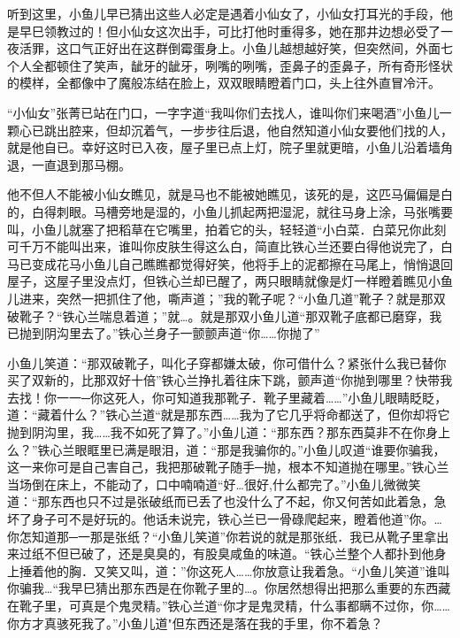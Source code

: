 \documentclass[12pt,oneside]{book}
\begin{document}
听到这里，小鱼儿早已猜出这些人必定是遇着小仙女了，小仙女打耳光的手段，他是早巳领教过的！但小仙女这次出手，可比打他时重得多，她在那井边想必受了一夜活罪，这口气正好出在这群倒霉蛋身上。小鱼儿越想越好笑，但突然间，外面七个人全都顿住了笑声，龇牙的龇牙，咧嘴的咧嘴，歪鼻子的歪鼻子，所有奇形怪状的模样，全都像中了魔般冻结在脸上，双双眼睛瞪着门口，头上往外直冒冷汗。

``小仙女''张菁已站在门口，一字字道``我叫你们去找人，谁叫你们来喝酒''小鱼儿一颗心已跳出腔来，但却沉着气，一步步往后退，他自然知道小仙女要他们找的人，就是他自已。幸好这时已入夜，屋子里已点上灯，院子里就更暗，小鱼儿沿着墙角退，一直退到那马棚。

他不但人不能被小仙女瞧见，就是马也不能被她瞧见，该死的是，这匹马偏偏是白的，白得刺眼。马槽旁地是湿的，小鱼儿抓起两把湿泥，就往马身上涂，马张嘴要叫，小鱼儿就塞了把稻草在它嘴里，拍着它的头，轻轻道``小白菜．白菜兄你此刻可千万不能叫出来，谁叫你皮肤生得这么白，简直比铁心兰还要白得他说完了，白马已变成花马小鱼儿自己瞧瞧都觉得好笑，他将手上的泥都擦在马尾上，悄悄退回屋子，这屋子里没点灯，但铁心兰却已醒了，两只眼睛就像是灯一样瞪着瞧见小鱼儿进来，突然一把抓住了他，嘶声道；''我的靴子呢？``小鱼几道''靴子？就是那双破靴子？``铁心兰喘息着道；''就\ldots。就是那双小鱼儿道``那双靴子底都已磨穿，我已抛到阴沟里去了。''铁心兰身子一颤颤声道``你\ldots\ldots 你抛了''

小鱼儿笑道：``那双破靴子，叫化子穿都嫌太破，你可借什么？紧张什么我已替你买了双新的，比那双好十倍''铁心兰挣扎着往床下跳，颤声道``你抛到哪里？快带我去找！你一一─你这死人，你可知道我那靴子．靴子里藏着\ldots\ldots{}''小鱼儿眼睛眨眨，道：``藏着什么？''铁心兰道``就是那东西\ldots\ldots 我为了它几乎将命都送了，但你却将它抛到阴沟里，我\ldots\ldots 我不如死了算了。''小鱼儿道：``那东西？那东西莫非不在你身上么？''铁心兰眼眶里已满是眼泪，道：``那是我骗你的。''小鱼儿叹道``谁要你骗我，这一来你可是自己害自己，我把那破靴子随手─抛，根本不知道抛在哪里。''铁心兰当场倒在床上，不能动了，口中喃喃道``好\ldots 很好,什么都完了。''小鱼儿微微笑道：``那东西也只不过是张破纸而已丢了也没什么了不起，你又何苦如此着急，急坏了身子可不是好玩的。他话未说完，铁心兰已一骨碌爬起来，瞪着他道''你。\ldots 你怎知道那─一那是张纸？``小鱼儿笑道''你若说的就是那张纸．我已从靴子里拿出来过纸不但已破了，还是臭臭的，有股臭咸鱼的味道。``铁心兰整个人都扑到他身上捶着他的胸．又笑又叫，道：''你这死人\ldots\ldots 你放意让我着急。``小鱼儿笑道''谁叫你骗我\ldots{}``我早巳猜出那东西是在你靴子里的\ldots。你居然想得出把那么重要的东西藏在靴子里，可真是个鬼灵精。''铁心兰道``你才是鬼灵精，什么事都瞒不过你，你\ldots\ldots 你方才真骇死我了。''小鱼儿道"但东西还是落在我的手里，你不着急？
\end{document}

